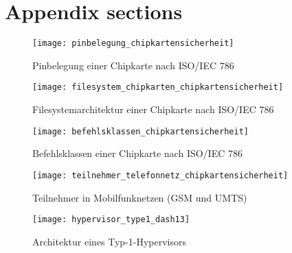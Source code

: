 \section{Appendix sections}

 \begin{figure}[htp]
  \begin{center}
   \texttt{[image: pinbelegung\_chipkartensicherheit]}
  \end{center}
  \caption[Pinbelegung einer Chipkarte]{Pinbelegung einer Chipkarte nach ISO/IEC 786 \cite{spitz11}}
  \label{abb:pinbelegung_chipkarten}
 \end{figure}

 \begin{figure}[htp]
  \begin{center}
   \texttt{[image: filesystem\_chipkarten\_chipkartensicherheit]}
  \end{center}
  \caption[Filesystemarchitektur einer Chipkarte]{Filesystemarchitektur einer Chipkarte nach ISO/IEC 786 \cite{spitz11}}
  \label{abb:filesystem_chipkarten}
 \end{figure}

  \begin{figure}[htp]
  \begin{center}
   \texttt{[image: befehlsklassen\_chipkartensicherheit]}
  \end{center}
  \caption[Befehlsklassen einer Chipkarte]{Befehlsklassen einer Chipkarte nach ISO/IEC 786 \cite{spitz11}}
  \label{abb:befehlsklassen_chipkarten}
 \end{figure}

  \begin{figure}[htp]
  \begin{center}
   \texttt{[image: teilnehmer\_telefonnetz\_chipkartensicherheit]}
  \end{center}
  \caption[Teilnehmer in Mobilfunknetzen]{Teilnehmer in Mobilfunknetzen (GSM und UMTS) \cite{spitz11}}
  \label{abb:teilnehmer_telefonnetz}
 \end{figure}

  \begin{figure}[htp]
  \begin{center}
   \texttt{[image: hypervisor\_type1\_dash13]}
  \end{center}
  \caption[Architektur eines Typ-1-Hypervisors]{Architektur eines Typ-1-Hypervisors \cite{dash13}}
  \label{abb:hypervisor_type1}
 \end{figure}

